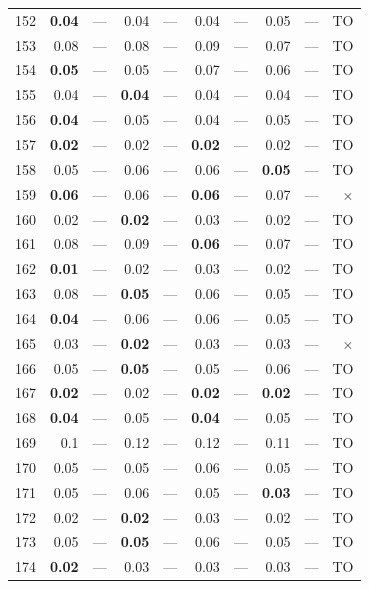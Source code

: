 \begin{longtable}{lr@{\hskip 4pt}l@{\hskip 12pt}r@{\hskip 4pt}l@{\hskip 12pt}r@{\hskip 4pt}l@{\hskip 12pt}r@{\hskip 4pt}l@{\hskip 12pt}r}
152 & \textbf{0.04} & --- & 0.04 & --- & 0.04 & --- & 0.05 & --- & TO \\
153 & 0.08 & --- & 0.08 & --- & 0.09 & --- & 0.07 & --- & TO \\
154 & \textbf{0.05} & --- & 0.05 & --- & 0.07 & --- & 0.06 & --- & TO \\
155 & 0.04 & --- & \textbf{0.04} & --- & 0.04 & --- & 0.04 & --- & TO \\
156 & \textbf{0.04} & --- & 0.05 & --- & 0.04 & --- & 0.05 & --- & TO \\
157 & \textbf{0.02} & --- & 0.02 & --- & \textbf{0.02} & --- & 0.02 & --- & TO \\
158 & 0.05 & --- & 0.06 & --- & 0.06 & --- & \textbf{0.05} & --- & TO \\
159 & \textbf{0.06} & --- & 0.06 & --- & \textbf{0.06} & --- & 0.07 & --- & $\times$ \\
160 & 0.02 & --- & \textbf{0.02} & --- & 0.03 & --- & 0.02 & --- & TO \\
161 & 0.08 & --- & 0.09 & --- & \textbf{0.06} & --- & 0.07 & --- & TO \\
162 & \textbf{0.01} & --- & 0.02 & --- & 0.03 & --- & 0.02 & --- & TO \\
163 & 0.08 & --- & \textbf{0.05} & --- & 0.06 & --- & 0.05 & --- & TO \\
164 & \textbf{0.04} & --- & 0.06 & --- & 0.06 & --- & 0.05 & --- & TO \\
165 & 0.03 & --- & \textbf{0.02} & --- & 0.03 & --- & 0.03 & --- & $\times$ \\
166 & 0.05 & --- & \textbf{0.05} & --- & 0.05 & --- & 0.06 & --- & TO \\
167 & \textbf{0.02} & --- & 0.02 & --- & \textbf{0.02} & --- & \textbf{0.02} & --- & TO \\
168 & \textbf{0.04} & --- & 0.05 & --- & \textbf{0.04} & --- & 0.05 & --- & TO \\
169 & 0.1 & --- & 0.12 & --- & 0.12 & --- & 0.11 & --- & TO \\
170 & 0.05 & --- & 0.05 & --- & 0.06 & --- & 0.05 & --- & TO \\
171 & 0.05 & --- & 0.06 & --- & 0.05 & --- & \textbf{0.03} & --- & TO \\
172 & 0.02 & --- & \textbf{0.02} & --- & 0.03 & --- & 0.02 & --- & TO \\
173 & 0.05 & --- & \textbf{0.05} & --- & 0.06 & --- & 0.05 & --- & TO \\
174 & \textbf{0.02} & --- & 0.03 & --- & 0.03 & --- & 0.03 & --- & TO \\

\end{longtable}
